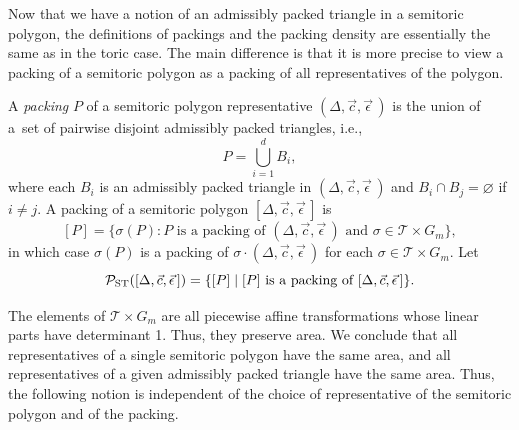 \documentclass[pdftex]{sigma}
\numberwithin{equation}{section}
\newcommand{\triangleline}{dashed}
\newcommand{\De}{\Delta}
\newcommand{\PST}{\mathcal{P}_{\rm ST}}
\newcommand{\stpoly}{[\De,\vec{c},\vec{\epsilon}\,]}
\newcommand{\strep}{(\De,\vec{c},\vec{\epsilon}\,)}
\begin{document}






Now that we have a notion of an admissibly packed triangle in a semitoric polygon, the definitions of packings and the packing density are essentially the same as in the toric case.
The main difference is that it is more precise to view a packing of a semitoric polygon as a packing of all representatives of the polygon.

\begin{Definition}\label{def:st-packing}
A \emph{packing} $P$ of a semitoric polygon representative $\strep$ is the union of a~set of pairwise disjoint admissibly packed triangles, i.e.,
\[P = \bigcup_{i=1}^d B_i,\]
where each $B_i$ is an admissibly packed triangle in $\strep$ and $B_i \cap B_j = \varnothing$
if $i \neq j$.
A packing of a semitoric polygon $\stpoly$ is
\[
 [P] = \{\sigma(P)\colon P \text{ is a packing of }\strep\text{ and }\sigma\in\mathcal{T}\times G_m\},
\]
in which case $\sigma(P)$ is a packing of $\sigma\cdot\strep$
for each $\sigma\in\mathcal{T}\times G_m$.
Let \[\PST(\stpoly) = \{[P] \mid [P] \text{ is a packing of } \stpoly \}.\]
\end{Definition}

The elements of $\mathcal{T}\times G_m$ are all piecewise affine transformations whose linear parts have determinant 1.
Thus, they preserve area.
We conclude that all representatives of a single semitoric polygon have the same area, and all representatives of a given admissibly packed triangle have the same area.
Thus, the following notion is independent of the choice of representative of the semitoric polygon and of the packing.
\end{document}
